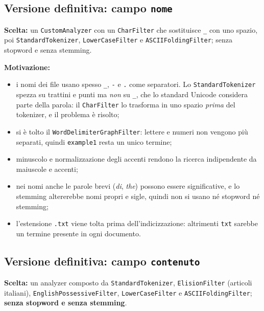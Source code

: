 \documentclass[11pt,a4paper]{article}
\newcommand{\code}[1]{\texttt{#1}}
\newcommand{\field}[1]{\texttt{#1}}
\begin{document}
\subsection{Versione definitiva: campo \field{nome}}

\textbf{Scelta:} un \code{CustomAnalyzer} con un \code{CharFilter} che sostituisce
\code{\_} con uno spazio, poi \code{StandardTokenizer}, \code{LowerCaseFilter} e
\code{ASCIIFoldingFilter}; senza stopword e senza stemming.

\textbf{Motivazione:}
\begin{itemize}
  \item i nomi dei file usano spesso \code{\_}, \code{-} e \code{.} come
        separatori. Lo \code{StandardTokenizer} spezza su trattini e punti ma
        \emph{non} su \code{\_}, che lo standard Unicode considera parte della
        parola: il \code{CharFilter} lo trasforma in uno spazio \emph{prima} del
        tokenizer, e il problema è risolto;
  \item si è tolto il \code{WordDelimiterGraphFilter}: lettere e numeri non vengono
        più separati, quindi \code{example1} resta un unico termine;
  \item minuscolo e normalizzazione degli accenti rendono la ricerca indipendente
        da maiuscole e accenti;
  \item nei nomi anche le parole brevi (\emph{di}, \emph{the}) possono essere
        significative, e lo stemming altererebbe nomi propri e sigle, quindi non
        si usano né stopword né stemming;
  \item l'estensione \code{.txt} viene tolta prima dell'indicizzazione:
        altrimenti \code{txt} sarebbe un termine presente in ogni documento.
\end{itemize}

\subsection{Versione definitiva: campo \field{contenuto}}

\textbf{Scelta:} un analyzer composto da \code{StandardTokenizer},
\code{ElisionFilter} (articoli italiani), \code{EnglishPossessiveFilter},
\code{LowerCaseFilter} e \code{ASCIIFoldingFilter}; \textbf{senza stopword e senza
stemming}.
\end{document}
